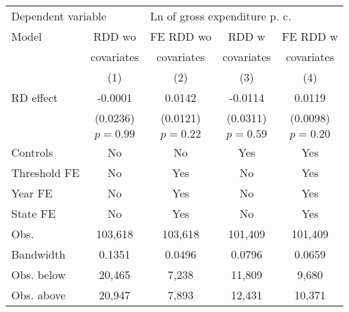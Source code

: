 \begin{tabular}{lcccc}
  \toprule
 \midrule
\multicolumn{2}{l}{Dependent variable} & \multicolumn{3}{l}{Ln of gross expenditure \acs{p. c.}} \\ 
 Model & \acs{RDD} \acs{wo} & \acs{FE} \acs{RDD} \acs{wo} & \acs{RDD} \acs{w} & \acs{FE} \acs{RDD} \acs{w} \\
   & covariates & covariates & covariates & covariates \\
   & (1) & (2) & (3) & (4) \\ 
   \midrule
\ac{RD} effect & -0.0001 & 0.0142 & -0.0114 & 0.0119 \\ 
   & (0.0236) & (0.0121) & (0.0311) & (0.0098) \\ 
   & $p=0.99$ & $p=0.22$ & $p=0.59$ & $p=0.20$ \\ 
   \midrule
Controls & No & No & Yes & Yes \\ 
  Threshold \acs{FE} & No & Yes & No & Yes \\ 
  Year \acs{FE} & No & Yes & No & Yes \\ 
  State \acs{FE} & No & Yes & No & Yes \\ 
   \midrule
\acs{Obs.} & 103,618 & 103,618 & 101,409 & 101,409 \\ 
  Bandwidth & 0.1351 & 0.0496 & 0.0796 & 0.0659 \\ 
  \acs{Obs.} below & 20,465 & 7,238 & 11,809 & 9,680 \\ 
  \acs{Obs.} above & 20,947 & 7,893 & 12,431 & 10,371 \\ 
   \midrule
 \bottomrule
\end{tabular}
